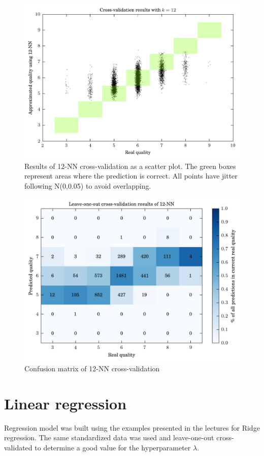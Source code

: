 \documentclass[notitlepage]{report}
\begin{document}
\begin{figure}
\includegraphics[width=\textwidth]{cv_scatters/12.png}
\caption{Results of 12-NN cross-validation as a scatter plot. The green boxes represent areas where the prediction is correct. All points have jitter following N(0,0.05) to avoid overlapping.}
\label{tbl:nn-scatter}
\end{figure}

\begin{figure}
\includegraphics[width=\textwidth]{12-nn-cv.png}
\caption{Confusion matrix of 12-NN cross-validation}
\label{tbl:nn-conf}
\end{figure}
\newpage
\section{Linear regression}
Regression model was built using the examples presented in the lectures for Ridge regression. The same standardized data was used and leave-one-out cross-validated to determine a good value for the hyperparameter $\lambda$.
\end{document}
